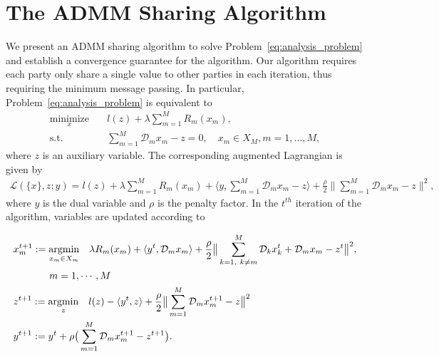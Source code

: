\section{The ADMM Sharing Algorithm}
We present an ADMM sharing algorithm \cite{boyd2011distributed, hong2016convergence} to solve Problem~\eqref{eq:analysis_problem} and establish a convergence guarantee for the algorithm. Our algorithm requires each party only share a single value to other parties in each iteration, thus requiring the minimum message passing. 
In particular, Problem~\eqref{eq:analysis_problem} is equivalent to
\begin{align}
\underset{x}{\text{minimize}} &\quad l\left(z\right) + \lambda\sum_{m=1}^{M} R_m(x_m),\\
\text{s.t.} &\quad \sum_{m=1}^{M} \mathcal{D}_m x_m - z = 0,\quad x_m\in X_M, m=1,\ldots,M,
\end{align}
where $z$ is an auxiliary variable. 
The corresponding augmented Lagrangian is given by
\begin{align}
\mathcal{L}(\{x\}, z; y) = l(z) + \lambda\sum_{m=1}^{M} R_m(x_m) + \langle y, \sum_{m=1}^{M}\mathcal{D}_m x_m - z\rangle + \frac{\rho}{2}\|\sum_{m=1}^{M} \mathcal{D}_m x_m - z\|^2, \label{eq:lagragian}
\end{align}
where $y$ is the dual variable and $\rho$ is the penalty factor.
In the $t^{th}$ iteration of the algorithm, variables are updated according to

\begin{align}
&x_m^{t+1}:=\underset{x_m\in X_m}{\text{argmin}}\quad\lambda R_m(x_m) + \langle y^t, \mathcal{D}_mx_m\rangle + \frac{\rho}{2}\big\|\sum_{\substack{k=1,~k\neq m}}^{M}\mathcal{D}_kx_k^{t} + \mathcal{D}_mx_m - z^t\big\|^2, \nonumber\\&\hspace*{36pt} m=1,\cdots,M\label{eq:pal_algo_x}\\
&z^{t+1}:=\underset{z}{\text{argmin}}\quad l(z)  - \langle y^t, z \rangle + \frac{\rho}{2} \big\|\sum_{m=1}^{M}\mathcal{D}_mx_m^{t+1} - z\big\|^2\label{eq:pal_algo_z}\\
&y^{t+1}:=y^t + \rho\big(\sum_{m=1}^{M}\mathcal{D}_mx_m^{t+1} - z^{t+1}\big).\label{eq:pal_algo_y}
\end{align}

